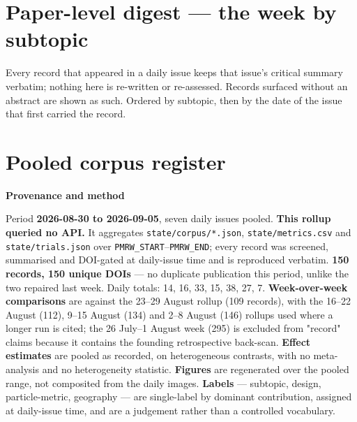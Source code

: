 \documentclass[10pt]{article}
\begin{document}
\section*{\sffamily\bfseries\color{Deep}Paper-level digest --- the week by subtopic}
\vspace{-1.5mm}{\color{Teal}\rule{\linewidth}{1.1pt}}\vspace{1mm}

{\fontsize{7.4}{9}\selectfont\color{Slate}Every record that appeared in a daily issue
keeps that issue's critical summary verbatim; nothing here is re-written or re-assessed.
Records surfaced without an abstract are shown as such. Ordered by subtopic, then by the
date of the issue that first carried the record.\par}



\section*{\sffamily\bfseries\color{Deep}Pooled corpus register}
\vspace{-1.5mm}{\color{Teal}\rule{\linewidth}{1.1pt}}\vspace{2.5mm}



\vspace{4mm}
\begin{keybox}
{\sffamily\bfseries\footnotesize\color{Deep}Provenance and method}\\[1.2mm]
{\fontsize{7.2}{8.8}\selectfont
Period \textbf{2026-08-30 to 2026-09-05}, seven daily issues pooled.
\textbf{This rollup queried no API.} It aggregates \texttt{state/corpus/*.json},
\texttt{state/metrics.csv} and \texttt{state/trials.json} over
\texttt{PMRW\_START}--\texttt{PMRW\_END}; every record was screened, summarised and
DOI-gated at daily-issue time and is reproduced verbatim. \textbf{150 records, 150 unique
DOIs} --- no duplicate publication this period, unlike the two repaired last week. Daily
totals: 14, 16, 33, 15, 38, 27, 7. \textbf{Week-over-week comparisons} are against the
23--29 August rollup (109 records), with the 16--22 August (112), 9--15 August (134) and
2--8 August (146) rollups used where a longer run is cited; the 26 July--1 August week
(295) is excluded from "record" claims because it contains the founding retrospective
back-scan. \textbf{Effect estimates} are pooled as recorded, on heterogeneous contrasts,
with no meta-analysis and no heterogeneity statistic. \textbf{Figures} are regenerated
over the pooled range, not composited from the daily images. \textbf{Labels} --- subtopic,
design, particle-metric, geography --- are single-label by dominant contribution, assigned
at daily-issue time, and are a judgement rather than a controlled vocabulary.\par}
\end{keybox}
\end{document}
